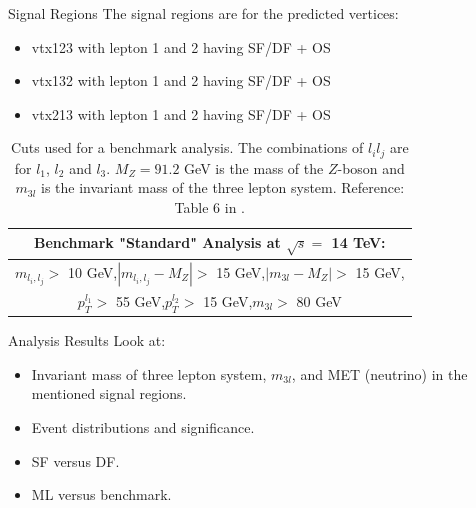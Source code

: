 \documentclass[notes]{beamer}
\begin{document}
	\begin{frame}[t]{Signal Regions}
		The signal regions are for the predicted vertices:
		\begin{itemize}
			\item vtx123 with lepton 1 and 2 having SF/DF + OS
			\item vtx132 with lepton 1 and 2 having SF/DF + OS
			\item vtx213 with lepton 1 and 2 having SF/DF + OS
		\end{itemize}
	
		\begin{table}[ht!]
			\centering
			\begin{tabular}{|c|}
				\hline \rule{0pt}{13pt}
				\textbf{Benchmark "Standard" Analysis at $\sqrt{s}=$ 14 TeV:}\\
				\hline \rule{0pt}{13pt}
				$m_{l_i,l_j}>$ 10 GeV,\quad $|m_{l_i,l_j}-M_Z|>$ 15 GeV,\quad $|m_{3l}-M_Z|>$ 15 GeV,\\
				$p_T^{l_1}>$ 55 GeV,\quad $p_T^{l_2}>$ 15 GeV,\quad $m_{3l}>$ 80 GeV\\
				\hline
			\end{tabular}
			\caption{Cuts used for a benchmark analysis. The combinations of $l_il_j$ are for $l_1$, $l_2$ and $l_3$. $M_Z=91.2$ GeV is the mass of the $Z$-boson and $m_{3l}$ is the invariant mass of the three lepton system. Reference: Table 6 in \citet{inverseseesaw}.}
			\label{tab:Cuts_Benchmark}
		\end{table}
	\end{frame}


	\begin{frame}[t]{Analysis Results}
		Look at:
		\begin{itemize}
			\item Invariant mass of three lepton system, $m_{3l}$, and MET (neutrino) in the mentioned signal regions.
			\item Event distributions and significance.
			\item SF versus DF.
			\item ML versus benchmark.
		\end{itemize}
	\end{frame}
\end{document}
